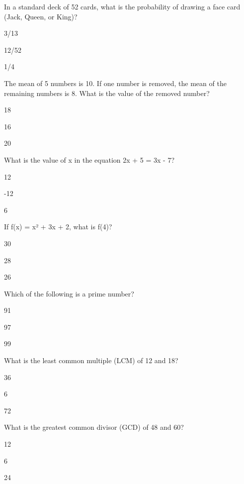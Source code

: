 \begin{enhancedmcq}{In a standard deck of 52 cards, what is the probability of drawing a face card (Jack, Queen, or King)?}
\item 3/13
\item 12/52
\item 1/4

\end{enhancedmcq}
\begin{enhancedmcq}{The mean of 5 numbers is 10. If one number is removed, the mean of the remaining numbers is 8. What is the value of the removed number?}
\item 18
\item 16
\item 20

\end{enhancedmcq}
\begin{enhancedmcq}{What is the value of x in the equation 2x + 5 = 3x - 7?}
\item 12
\item -12
\item 6

\end{enhancedmcq}
\begin{enhancedmcq}{If f(x) = x² + 3x + 2, what is f(4)?}
\item 30
\item 28
\item 26

\end{enhancedmcq}
\begin{enhancedmcq}{Which of the following is a prime number?}
\item 91
\item 97
\item 99

\end{enhancedmcq}
\begin{enhancedmcq}{What is the least common multiple (LCM) of 12 and 18?}
\item 36
\item 6
\item 72

\end{enhancedmcq}
\begin{enhancedmcq}{What is the greatest common divisor (GCD) of 48 and 60?}
\item 12
\item 6
\item 24

\end{enhancedmcq}
